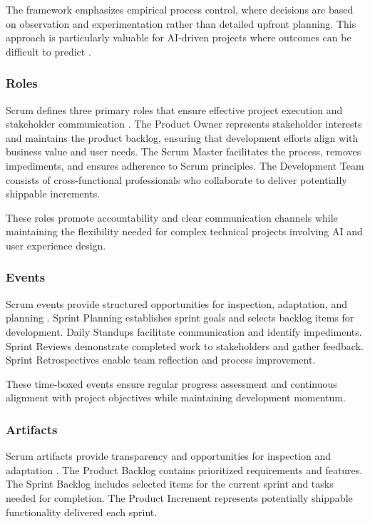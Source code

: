 The framework emphasizes empirical process control, where decisions are based on observation and experimentation rather than detailed upfront planning. This approach is particularly valuable for AI-driven projects where outcomes can be difficult to predict \cite{empirical_scrum}.

\subsubsection{Roles}

Scrum defines three primary roles that ensure effective project execution and stakeholder communication \cite{scrum_roles}. The Product Owner represents stakeholder interests and maintains the product backlog, ensuring that development efforts align with business value and user needs. The Scrum Master facilitates the process, removes impediments, and ensures adherence to Scrum principles. The Development Team consists of cross-functional professionals who collaborate to deliver potentially shippable increments.

These roles promote accountability and clear communication channels while maintaining the flexibility needed for complex technical projects involving AI and user experience design.

\subsubsection{Events}

Scrum events provide structured opportunities for inspection, adaptation, and planning \cite{scrum_events}. Sprint Planning establishes sprint goals and selects backlog items for development. Daily Standups facilitate communication and identify impediments. Sprint Reviews demonstrate completed work to stakeholders and gather feedback. Sprint Retrospectives enable team reflection and process improvement.

These time-boxed events ensure regular progress assessment and continuous alignment with project objectives while maintaining development momentum.

\subsubsection{Artifacts}

Scrum artifacts provide transparency and opportunities for inspection and adaptation \cite{scrum_artifacts}. The Product Backlog contains prioritized requirements and features. The Sprint Backlog includes selected items for the current sprint and tasks needed for completion. The Product Increment represents potentially shippable functionality delivered each sprint.

